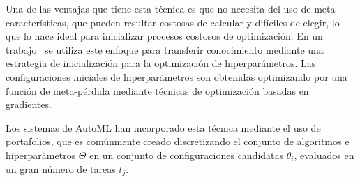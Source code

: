 Una de las ventajas que tiene esta técnica es que no necesita del uso de meta-características, que pueden resultar costosas de calcular y difíciles de elegir, lo que lo hace ideal para inicializar procesos costosos de optimización. En un trabajo~\cite{witsuba2015learning} se utiliza este enfoque para transferir conocimiento mediante una estrategia de inicialización para la optimización de hiperparámetros. Las configuraciones iniciales de hiperparámetros son obtenidas optimizando por una función de meta-pérdida mediante técnicas de optimización basadas en gradientes.

%

Los sistemas de AutoML han incorporado esta técnica mediante el uso de portafolios, que es comúnmente creado discretizando el conjunto de algoritmos e hiperparámetros $\Theta$ en un conjunto de configuraciones candidatas $\theta_i$, evaluados en un gran número de tareas $t_j$.

